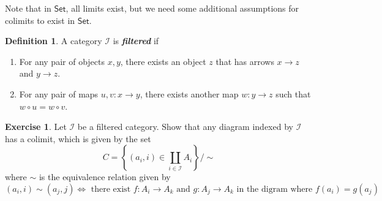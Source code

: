 \documentclass[psamsfonts]{amsart}
\theoremstyle{definition}
\newtheorem{defn}[thm]{Definition}
\newtheorem{exer}[thm]{Exercise}
\theoremstyle{remark}
\newcommand{\ib}[1]{\textbf{\textit{#1}}}
\newcommand{\set}[1]{\left\lbrace #1 \right\rbrace}
\begin{document}
Note that in $\mathsf{Set}$, all limits exist, but we need some additional assumptions for colimits to exist in $\mathsf{Set}$.
%
\begin{defn}
A category $\mathscr{I}$ is \ib{filtered} if 
\begin{enumerate}
\item For any pair of objects $x,y$, there exists an object $z$ that has arrows $x \to z$ and $y \to z$.
\item For any pair of maps $u,v : x \to y$, there exists another map $w: y \to z$ such that $w \circ u = w \circ v$.
\end{enumerate}
\end{defn}
%
\begin{exer}
Let $\mathscr{I}$ be a filtered category. Show that any diagram indexed by $\mathscr{I}$ has a colimit, which is given by the set
$$C = \set{(a_i,i) \in \coprod_{i \in \mathscr{I}}A_i} \bigg/ \sim $$
where $\sim$ is the equivalence relation given by
$$(a_i,i) \sim (a_j,j) \iff \text{ there exist } f: A_i \to A_k \text{ and } g: A_j \to A_k \text{ in the digram where } f(a_i) = g(a_j)$$
\end{exer}
%
\end{document}
